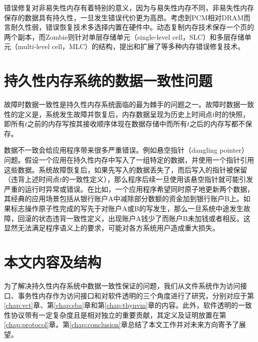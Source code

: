 错误修复对非易失性内存有着特别的意义，因为与易失性内存不同，非易失性内存保存的数据具有持久性，一旦发生错误代价更为高昂。考虑到PCM相对DRAM而言耐久性弱，错误恢复技术多选择内置在硬件中。动态复制内存技术\cite{Ipek:2010:DRM:1736020.1736023}保存一个页的两个副本，而Zombie\cite{Azevedo:2013:ZME:2485922.2485961}则针对单层存储单元（single-level cell，SLC）和多层存储单元（multi-level cell，MLC）的结构，提出和扩展了等多种内存错误修复技术。

\section{持久性内存系统的数据一致性问题}
\label{sec:crash-consistency}

故障时数据一致性是持久性内存系统面临的最为棘手的问题之一\cite{Onur:2014:RPO}。故障时数据一致性的定义是，系统发生故障并恢复后，内存数据呈现为历史上时间点$t$时的快照，即所有$t$之前的内存写按其接收顺序体现在数据存储中而所有$t$之后的内存写都不保存。

数据不一致会给应用程序带来很多严重错误。例如悬空指针（dangling pointer）问题\cite{Volos:2011:MLP:1950365.1950379,Coburn:2011:NMP:1950365.1950380}。假设一个应用在持久性内存中写入了一组特定的数据，并使用一个指针引用这些数据。系统故障恢复后，如果先写入的数据丢失了，而后写入的指针被保留（违背上述时间点$t$的一致性定义），那么程序后续一旦使用该悬空指针就可能引发严重的运行时异常或错误。在比如，一个应用程序希望同时原子地更新两个数据，其经典的应用场景包括从银行账户A中减除部分数额的资金加到银行账户B上。如果标志操作原子性完成的写先于对账户A或B的写发生，那么一旦系统中途发生故障，回滚的状态违背一致性定义，出现账户A钱少了而账户B未加钱或者相反。这显然无法满足程序语义上的要求，可能对各方系统用户造成重大损失。

\section{本文内容及结构}

为了解决持久性内存系统中数据一致性保证的问题，我们从文件系统作为访问接口、事务性内存作为访问接口和对软件透明的三个角度进行了研究，分别对应于第\ref{chap:vct}章、第\ref{chap:sba}章和第\ref{chap:thynvm}章的内容。此外，软件透明的一致性协议带有一定复杂度且是相对独立的重要贡献，其定义及证明放置在第\ref{chap:protocol}章。第\ref{chap:conclusion}章总结了本文工作并对未来方向寄予了展望。


